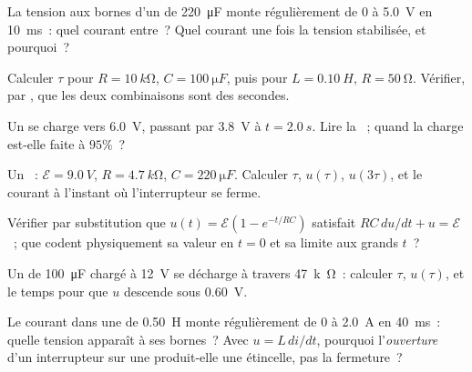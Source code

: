 \begin{exercise}[$\star$]\label{exo:g12:rc-rl-circuits:3}
La tension aux bornes d'un
 de \qty{220}{\micro F} monte régulièrement
de $0$ à \qty{5.0}{V} en \qty{10}{ms}~: quel courant entre~? Quel
courant une fois la tension stabilisée, et
pourquoi~?
\end{exercise}

\begin{exercise}[$\star$]\label{exo:g12:rc-rl-circuits:4}
Calculer $\tau$ pour $R = \qty{10}{k\ohm}$, $C = \qty{100}{\micro F}$,
puis pour $L = \qty{0.10}{H}$, $R = \qty{50}{\ohm}$. Vérifier,
 par , que les deux
combinaisons sont des secondes.
\end{exercise}

\begin{exercise}[$\star$]\label{exo:g12:rc-rl-circuits:5}
Un  se charge vers \qty{6.0}{V}, passant par
\qty{3.8}{V} à $t = \qty{2.0}{s}$. Lire la
~; quand la charge est-elle faite
à $95\%$~?
\end{exercise}

\begin{exercise}[$\star\star$]\label{exo:g12:rc-rl-circuits:6}
Un ~: $\mathcal{E} = \qty{9.0}{V}$,
$R = \qty{4.7}{k\ohm}$, $C = \qty{220}{\micro F}$. Calculer $\tau$,
$u(\tau)$, $u(3\tau)$, et le courant à l'instant où l'interrupteur se
ferme.
\end{exercise}

\begin{exercise}[$\star\star$]\label{exo:g12:rc-rl-circuits:7}
Vérifier par substitution que $u(t) = \mathcal{E}(1 - e^{-t/RC})$
satisfait $RC\,du/dt + u = \mathcal{E}$~; que codent physiquement sa
valeur en $t = 0$ et sa limite aux grands $t$~?
\end{exercise}

\begin{exercise}[$\star\star$]\label{exo:g12:rc-rl-circuits:8}
Un  de \qty{100}{\micro F} chargé à
\qty{12}{V} se décharge à travers \qty{47}{k\ohm}~: calculer $\tau$,
$u(\tau)$, et le temps pour que $u$ descende sous \qty{0.60}{V}.
\end{exercise}

\begin{exercise}[$\star\star$]\label{exo:g12:rc-rl-circuits:9}
Le courant dans une  de \qty{0.50}{H} monte
régulièrement de $0$ à \qty{2.0}{A} en \qty{40}{ms}~: quelle
tension apparaît à ses bornes~? Avec
$u = L\,di/dt$, pourquoi l'\emph{ouverture} d'un interrupteur sur une
 produit-elle une étincelle, pas la fermeture~?
\end{exercise}

